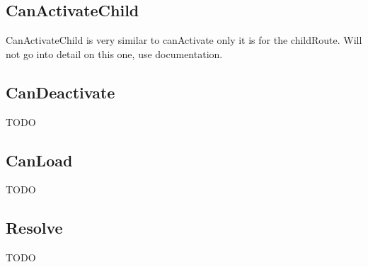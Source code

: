 \subsection{ CanActivateChild }
CanActivateChild is very similar to canActivate only it is for the childRoute.
Will not go into detail on this one, use documentation.

\subsection{ CanDeactivate }
TODO

\subsection{ CanLoad }
TODO

\subsection{ Resolve }
TODO
